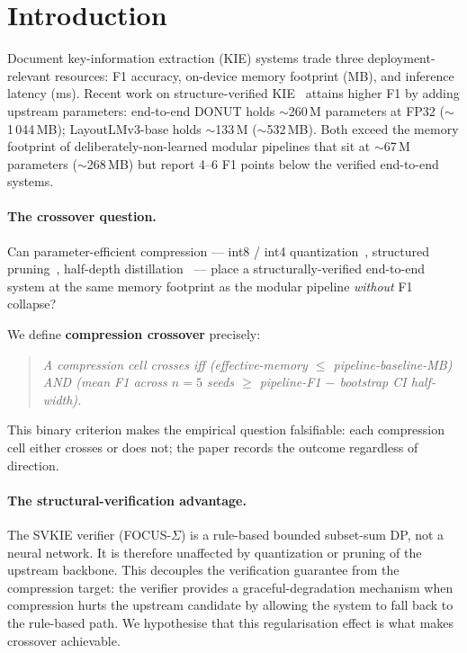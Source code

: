 \section{Introduction}
\label{sec:intro}

Document key-information extraction (KIE) systems trade three
deployment-relevant resources: F1 accuracy, on-device memory
footprint (MB), and inference latency (ms).  Recent work on
structure-verified KIE~\cite{kim2022donut,huang2022layoutlmv3}
attains higher F1 by adding upstream parameters: end-to-end DONUT
holds $\sim$260\,M parameters at FP32 ($\sim$1\,044\,MB);
LayoutLMv3-base holds $\sim$133\,M ($\sim$532\,MB).  Both exceed the
memory footprint of deliberately-non-learned modular pipelines that
sit at $\sim$67\,M parameters ($\sim$268\,MB) but report 4--6 F1
points below the verified end-to-end systems.

\paragraph{The crossover question.}  Can parameter-efficient
compression --- int8 / int4
quantization~\cite{frantar2023optq,dettmers2023qlora}, structured
pruning~\cite{ma2023llmpruner}, half-depth
distillation~\cite{hinton2015distilling} --- place a
structurally-verified end-to-end system at the same memory
footprint as the modular pipeline \emph{without} F1 collapse?

We define \textbf{compression crossover} precisely:

\begin{quote}
\textit{A compression cell crosses iff
 (effective-memory $\leq$ pipeline-baseline-MB) AND
 (mean F1 across $n=5$ seeds $\geq$ pipeline-F1 $-$ bootstrap
 CI half-width).}
\end{quote}

This binary criterion makes the empirical question falsifiable:
each compression cell either crosses or does not; the paper
records the outcome regardless of direction.

\paragraph{The structural-verification advantage.}  The SVKIE
verifier (FOCUS-$\Sigma$) is a rule-based bounded subset-sum DP, not
a neural network.  It is therefore unaffected by quantization or
pruning of the upstream backbone.  This decouples the verification
guarantee from the compression target: the verifier provides a
graceful-degradation mechanism when compression hurts the upstream
candidate by allowing the system to fall back to the rule-based
path.  We hypothesise that this regularisation effect is what makes
crossover achievable.

